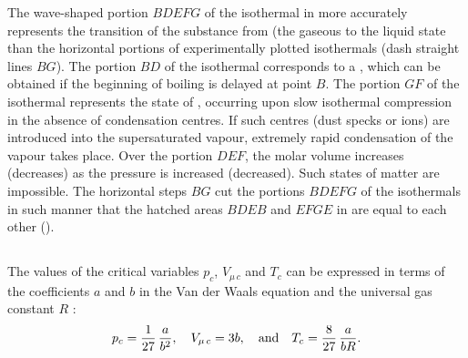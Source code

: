 The wave-shaped portion $BDEFG$ of the isothermal in  more accurately represents the transition of the substance from (the gaseous to the liquid state than the horizontal portions of experimentally plotted isothermals (dash straight lines $BG$). The portion $BD$ of the isothermal corresponds to a , which can be obtained if the beginning of boiling is delayed at point $B$. The portion $GF$ of the isothermal represents the state of , occurring upon slow isothermal compression in the absence of condensation centres. If such centres (dust specks or ions) are introduced into the supersatu­rated vapour, extremely rapid condensation of the vapour takes place. Over the portion $DEF$, the molar volume increases (decreases) as the pressure is increased (decreased). Such states of matter are impossible. The horizontal steps $BG$ cut the portions $BDEFG$ of the isothermals in such manner that the hatched areas $BDEB$ and $EFGE$ in  are equal to each other ().

\clearpage

\subsection{}\label{12.3.7} The values of the critical variables $p_{c}$, $V_{\mu \, c}$ and $T_{c}$  can be expressed in terms of the coefficients $a$ and $b$ in the Van der Waals equation  and the universal gas constant $R$ :
\begin{equation*}%
p_{c} = \frac{1}{27} \, \frac{a}{b^{2}}, \quad V_{\mu \, c} = 3b	, \qand T_{c} = \frac{8}{27} \, \frac{a}{bR}.
\end{equation*}

